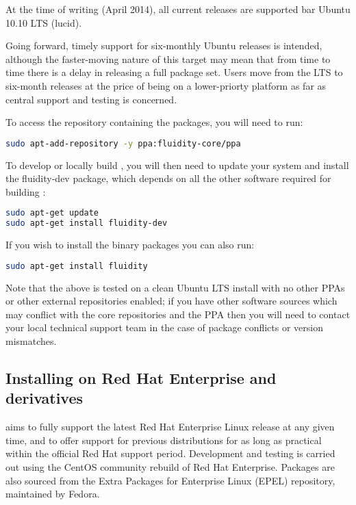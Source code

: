 At the time of writing (April 2014), all current releases are supported bar
Ubuntu 10.10 LTS (lucid).

Going forward, timely support for six-monthly Ubuntu releases is intended,
although the faster-moving nature of this target may mean that from time to
time there is a delay in releasing a full \fluidity package set. Users move
from the LTS to six-month releases at the price of being on a lower-priorty
platform as far as central \fluidity support and testing is concerned.

To access the repository containing the \fluidity packages, you will
need to run:

\begin{lstlisting}[language=bash]
sudo apt-add-repository -y ppa:fluidity-core/ppa
\end{lstlisting}

To develop or locally build \fluidity, you will then need to update your system
and install the fluidity-dev package, which depends on all the other software
required for building \fluidity:


\begin{lstlisting}[language=bash]
sudo apt-get update
sudo apt-get install fluidity-dev
\end{lstlisting}

If you wish to install the \fluidity binary packages you can also run:

\begin{lstlisting}[language=bash]
sudo apt-get install fluidity
\end{lstlisting}

Note that the above is tested on a clean Ubuntu LTS install with no other PPAs
or other external repositories enabled; if you have other software sources
which may conflict with the core repositories and the \fluidity PPA then you
will need to contact your local technical support team in the case of package
conflicts or version mismatches.

\subsection{Installing on Red Hat Enterprise and derivatives}
\label{sec:required_ḻibraries_redhat}

\fluidity aims to fully support the latest Red Hat Enterprise Linux release at any given
time, and to offer support for previous distributions for as long as practical
within the official Red Hat support period. Development and testing is carried
out using the CentOS community rebuild of Red Hat Enterprise. Packages are also
sourced from the Extra Packages for Enterprise Linux (EPEL) repository,
maintained by Fedora.

